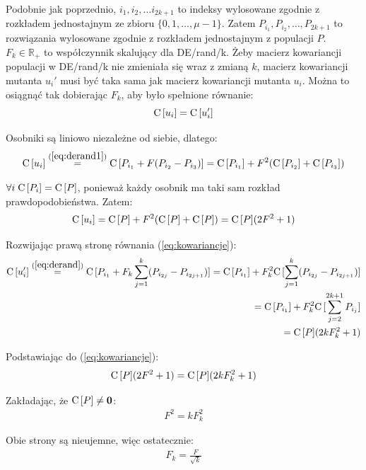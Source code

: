 \documentclass[a4paper,onecolumn,oneside,11pt,wide,floatssmall]{mwrep}
\def\C{{\rm C}\,}
\theoremstyle{definition}
\theoremstyle{plain}%
\theoremstyle{remark}
\begin{document}
Podobnie jak poprzednio, $i_1, i_2, \dots i_{2k+1}$ to indeksy wylosowane zgodnie z rozkładem jednostajnym ze zbioru 
$\{0, 1, \dots, \mu-1\}$. Zatem $P_{i_1}, P_{i_2}, \dots, P_{2k+1}$ to rozwiązania wylosowane zgodnie z rozkładem 
jednostajnym z populacji $P$. $F_k\in\mathbb{R_+}$ to współczynnik skalujący dla DE/rand/k. 
Żeby macierz kowariancji populacji w DE/rand/k nie zmieniała się wraz z zmianą $k$, 
macierz kowariancji mutanta $u_i'$ musi być taka sama jak macierz kowariancji mutanta $u_i$.
Można to osiągnąć tak dobierając $F_k$, aby było spełnione równanie:
\begin{equation} \label{eq:kowariancje}
\C[u_i] = \C[u_i']
\end{equation}

Osobniki są liniowo niezależne od siebie, dlatego:
\begin{align*}
\C[u_i] \overset{(\ref{eq:derand1})}{=} \C[P_{i_1} + F(P_{i_2} - P_{i_3})] = \C[P_{i_1}] + F^2(\C[P_{i_2}] + \C[P_{i_3}])
\end{align*}

$\forall{i}\hspace{1mm}\C[P_i] = \C[P]$, ponieważ każdy osobnik ma taki sam rozkład prawdopodobieństwa. Zatem:
\begin{equation} \label{eq:macierz_kow_mutanta}
\C[u_i] = \C[P] + F^2(\C[P] + \C[P]) = \C[P](2F^2 + 1)
\end{equation}

Rozwijając prawą stronę równania (\ref{eq:kowariancje}):
\begin{align*}
\C[u_i'] \overset{(\ref{eq:derand})}{=} \C[P_{i_1} + F_k\sum\limits_{j=1}^k (P_{i_{2j}} - P_{i_{2j+1}})] 
= \C[P_{i_1}] + F_k^2\C[\sum\limits_{j=1}^k (P_{i_{2j}} - P_{i_{2j+1}})] \\
= \C[P_{i_1}] + F_k^2\C[\sum\limits_{j=2}^{2k+1} P_{i_{j}}] \\
= \C[P](2kF_k^2 + 1)
\end{align*}

Podstawiając do (\ref{eq:kowariancje}):
\begin{align*}
\C[P](2F^2 + 1) = \C[P](2kF_k^2 + 1)
\end{align*}

Zakładając, że $\C[P] \neq \textbf{0}$:
\begin{align*}
F^2 = kF_k^2
\end{align*}

Obie strony są nieujemne, więc ostatecznie:
\begin{align*}
F_k = \frac{F}{\sqrt{k}}
\end{align*}
\end{document}
